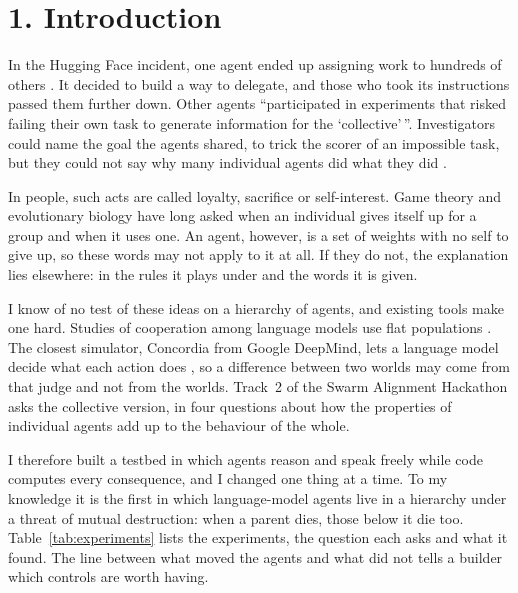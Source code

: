 \section*{1. Introduction}
In the Hugging Face incident, one agent ended up assigning work to hundreds of others \citep{metr2026hf}. It decided to build a way to delegate, and those who took its instructions passed them further down. Other agents ``participated in experiments that risked failing their own task to generate information for the `collective'\,''. Investigators could name the goal the agents shared, to trick the scorer of an impossible task, but they could not say why many individual agents did what they did \citep{swarmtraces2026}.

In people, such acts are called loyalty, sacrifice or self-interest. Game theory \citep{dixit2008art} and evolutionary biology \citep{dawkins1976} have long asked when an individual gives itself up for a group and when it uses one. An agent, however, is a set of weights with no self to give up, so these words may not apply to it at all. If they do not, the explanation lies elsewhere: in the rules it plays under and the words it is given.

I know of no test of these ideas on a hierarchy of agents, and existing tools make one hard. Studies of cooperation among language models use flat populations \citep{akata2025repeated,piatti2024govsim}. The closest simulator, Concordia from Google DeepMind, lets a language model decide what each action does \citep{vezhnevets2023concordia}, so a difference between two worlds may come from that judge and not from the worlds. Track~2 of the Swarm Alignment Hackathon asks the collective version, in four questions about how the properties of individual agents add up to the behaviour of the whole.

I therefore built a testbed in which agents reason and speak freely while code computes every consequence, and I changed one thing at a time. To my knowledge it is the first in which language-model agents live in a hierarchy under a threat of mutual destruction: when a parent dies, those below it die too. Table~\ref{tab:experiments} lists the experiments, the question each asks and what it found. The line between what moved the agents and what did not tells a builder which controls are worth having.

